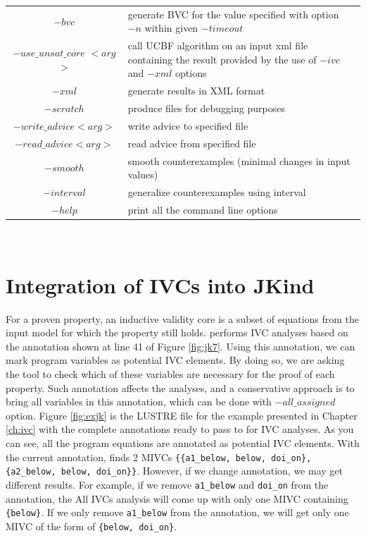 \begin{table}
\begin{tabularx}{\linewidth}{|c|L|}
  $-bvc$ & generate BVC for the value specified with option $-n$ within given $-timeout$ \\[0.5ex]
  $-use\_unsat\_core$ $<$$arg$$>$ & call UCBF algorithm on an input xml file containing the result provided by the use of $-ivc$ and $-xml$ options\\[0.5ex]\hline
  $-xml$ & generate results in XML format\\[0.5ex]
  $-scratch$ & produce files for debugging purposes\\[0.5ex]\hline
    $-write\_advice <arg>$ & write advice to specified file\\[0.5ex]
  $ -read\_advice <arg>$ & read advice from specified file \\[0.5ex]\hline
    $-smooth$ & smooth counterexamples (minimal changes in  input values)\\[0.5ex]
    $-interval$ & generalize counterexamples using interval\\[0.5ex]\hline
  $-help$ & print all the command line options \\[0.5ex]
  \hline
\end{tabularx}\\
\label{tab:jkindcm}
\end{table}

\section{Integration of IVCs into {\sc JKind}}

For a proven property, an inductive validity core is a subset of \lustre equations from the input model for which the property still
holds.  \jkind performs IVC analyses based on the annotation shown at line 41 of Figure \ref{fig:jk7}. Using this annotation, we can mark program variables as potential IVC elements. By doing so, we are asking the tool to check which of these variables are necessary for the proof of each property. Such annotation affects the analyses, and a conservative approach is to bring all variables in this annotation, which can be done with $-all\_assigned$ \jkind option.
Figure \ref{fig:exjk} is the LUSTRE file for the example presented in Chapter \ref{ch:ivc} with the complete annotations ready to pass to \jkind for IVC analyses. As you can see, all the program equations are annotated as potential IVC elements. With the current annotation, \jkind finds 2 MIVCs  {\small \texttt{\{\{a1\_below, below, doi\_on\}, \{a2\_below, below, doi\_on\}\}}}.
However, if we change annotation, we may get different results. For example, if we remove  {\small \texttt{a1\_below}} and {\small \texttt{doi\_on}} from the annotation, the All IVCs analysis will come up with only one
MIVC containing {\small \texttt{\{below\}}}. If we only remove {\small \texttt{a1\_below}} from the annotation, we will get only one MIVC of the form of {\small \texttt{\{below, doi\_on\}}}.

